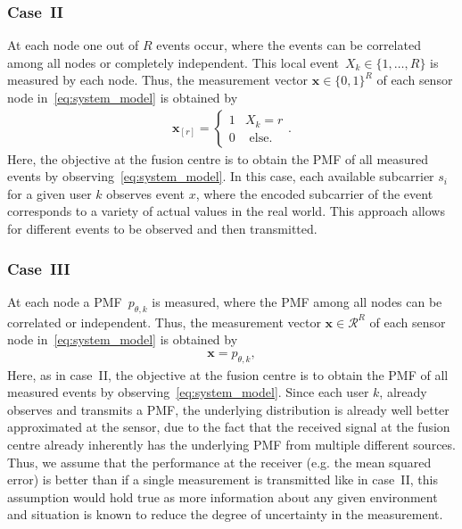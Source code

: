\documentclass{article}
\begin{document}
\subsubsection{Case~II}
At each node one out of $R$ events occur, where the events can be correlated among all nodes or completely independent. This local event~${X_k \in \{1, \ldots, R\}}$ is measured by each node. Thus, the measurement vector $\boldsymbol{x} \in \{0,1\}^{R}$ of each sensor node in~\ref{eq:system_model} is obtained by
\begin{align}
    \boldsymbol{x}_{[r]} 
    = 
    \begin{cases}
        1 & X_k = r
        \\[2ex]
        0 & \text{ else}.
    \end{cases}
    . \label{eq:event02independent}
\end{align}
Here, the objective at the fusion centre is to obtain the PMF of all measured events by observing~\ref{eq:system_model}. In this case, each available subcarrier $s_i$ for a given user $k$ observes event $x$, where the encoded subcarrier of the event corresponds to a variety of actual values in the real world. This approach allows for different events to be observed and then transmitted.

\subsubsection{Case~III}\label{case3}
At each node a PMF~$p_{\theta,k}$ is measured, where the PMF among all nodes can be correlated or independent. Thus, the measurement vector $\boldsymbol{x} \in \mathcal{R}^{R}$ of each sensor node in~\ref{eq:system_model} is obtained by
\begin{align}
    \boldsymbol{x} = p_{\theta,k}
    , \label{eq:event03PMF}
\end{align}
Here, as in case~II, the objective at the fusion centre is to obtain the PMF of all measured events by observing~\ref{eq:system_model}. Since each user $k$, already observes and transmits a PMF, the underlying distribution is already well better approximated at the sensor, due to the fact that the received signal at the fusion centre already inherently has the underlying PMF from multiple different sources. Thus, we assume that the performance at the receiver (e.g. the mean squared error) is better than if a single measurement is transmitted like in case~II, this assumption would hold true as more information about any given environment and situation is known to reduce the degree of uncertainty in the measurement.
\end{document}
